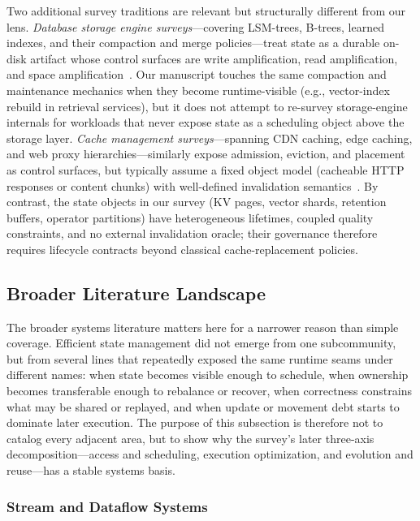 \documentclass[acmsmall,screen,review]{acmart}
\begin{document}
Two additional survey traditions are relevant but structurally different from our lens. \emph{Database storage engine surveys}---covering LSM-trees, B-trees, learned indexes, and their compaction and merge policies---treat state as a durable on-disk artifact whose control surfaces are write amplification, read amplification, and space amplification~\cite{luo2020lsm}. Our manuscript touches the same compaction and maintenance mechanics when they become runtime-visible (e.g., vector-index rebuild in retrieval services), but it does not attempt to re-survey storage-engine internals for workloads that never expose state as a scheduling object above the storage layer. \emph{Cache management surveys}---spanning CDN caching, edge caching, and web proxy hierarchies---similarly expose admission, eviction, and placement as control surfaces, but typically assume a fixed object model (cacheable HTTP responses or content chunks) with well-defined invalidation semantics~\cite{ali2011survey}. By contrast, the state objects in our survey (KV pages, vector shards, retention buffers, operator partitions) have heterogeneous lifetimes, coupled quality constraints, and no external invalidation oracle; their governance therefore requires lifecycle contracts beyond classical cache-replacement policies.

\subsection{Broader Literature Landscape}

The broader systems literature matters here for a narrower reason than simple coverage. Efficient state management did not emerge from one subcommunity, but from several lines that repeatedly exposed the same runtime seams under different names: when state becomes visible enough to schedule, when ownership becomes transferable enough to rebalance or recover, when correctness constrains what may be shared or replayed, and when update or movement debt starts to dominate later execution. The purpose of this subsection is therefore not to catalog every adjacent area, but to show why the survey's later three-axis decomposition---access and scheduling, execution optimization, and evolution and reuse---has a stable systems basis.

\subsubsection{Stream and Dataflow Systems}
\end{document}
